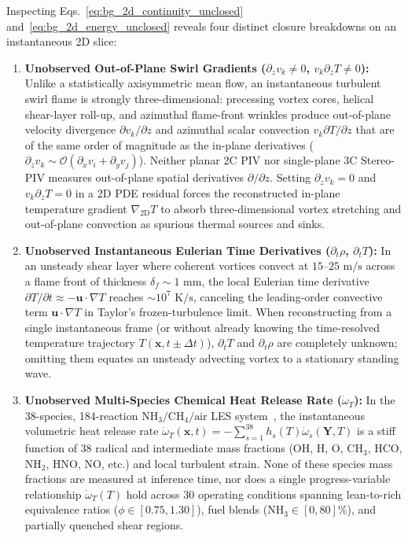 Inspecting Eqs.~\eqref{eq:bg_2d_continuity_unclosed} and~\eqref{eq:bg_2d_energy_unclosed} reveals four distinct closure breakdowns on an instantaneous 2D slice:

\begin{enumerate}
    \item \textbf{Unobserved Out-of-Plane Swirl Gradients ($\partial_z v_k \neq 0$, $v_k \partial_z T \neq 0$):} Unlike a statistically axisymmetric mean flow, an instantaneous turbulent swirl flame is strongly three-dimensional: precessing vortex cores, helical shear-layer roll-up, and azimuthal flame-front wrinkles produce out-of-plane velocity divergence $\partial v_k / \partial z$ and azimuthal scalar convection $v_k \partial T / \partial z$ that are of the same order of magnitude as the in-plane derivatives ($\partial_z v_k \sim \mathcal{O}(\partial_x v_i + \partial_y v_j)$). Neither planar 2C PIV nor single-plane 3C Stereo-PIV measures out-of-plane spatial derivatives $\partial / \partial z$. Setting $\partial_z v_k = 0$ and $v_k \partial_z T = 0$ in a 2D PDE residual forces the reconstructed in-plane temperature gradient $\nabla_{\text{2D}} T$ to absorb three-dimensional vortex stretching and out-of-plane convection as spurious thermal sources and sinks.

    \item \textbf{Unobserved Instantaneous Eulerian Time Derivatives ($\partial_t \rho$, $\partial_t T$):} In an unsteady shear layer where coherent vortices convect at $15\text{--}25\text{ m/s}$ across a flame front of thickness $\delta_f \sim 1\text{ mm}$, the local Eulerian time derivative $\partial T / \partial t \approx -\mathbf{u} \cdot \nabla T$ reaches $\sim 10^7\text{ K/s}$, canceling the leading-order convective term $\mathbf{u} \cdot \nabla T$ in Taylor's frozen-turbulence limit. When reconstructing from a single instantaneous frame (or without already knowing the time-resolved temperature trajectory $T(\mathbf{x}, t \pm \Delta t)$), $\partial_t T$ and $\partial_t \rho$ are completely unknown; omitting them equates an unsteady advecting vortex to a stationary standing wave.

    \item \textbf{Unobserved Multi-Species Chemical Heat Release Rate ($\dot{\omega}_T$):} In the 38-species, 184-reaction $\text{NH}_3/\text{CH}_4/\text{air}$ LES system~\cite{hu2026realpdebench}, the instantaneous volumetric heat release rate $\dot{\omega}_T(\mathbf{x}, t) = -\sum_{s=1}^{38} h_s(T)\dot{\omega}_s(\mathbf{Y}, T)$ is a stiff function of 38 radical and intermediate mass fractions ($\text{OH}$, $\text{H}$, $\text{O}$, $\text{CH}_3$, $\text{HCO}$, $\text{NH}_2$, $\text{HNO}$, $\text{NO}$, etc.) and local turbulent strain. None of these species mass fractions are measured at inference time, nor does a single progress-variable relationship $\dot{\omega}_T(T)$ hold across 30 operating conditions spanning lean-to-rich equivalence ratios ($\phi \in [0.75, 1.30]$), fuel blends ($\text{NH}_3 \in [0, 80]\%$), and partially quenched shear regions.


\end{enumerate}
